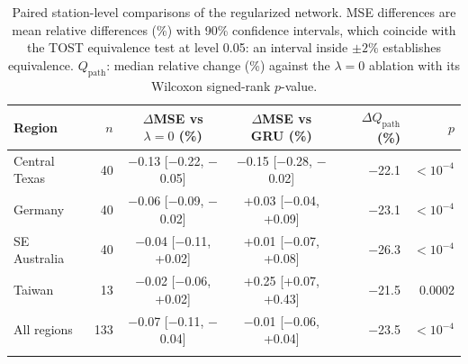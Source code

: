 \begin{table}[tbp]
\caption{Paired station-level comparisons of the regularized network. MSE differences are mean relative differences (\%)
with 90\% confidence intervals, which coincide with the TOST equivalence test at level 0.05: an interval
inside $\pm2\%$ establishes equivalence. $Q_{\mathrm{path}}$: median relative change (\%) against the
$\lambda=0$ ablation with its Wilcoxon signed-rank $p$-value.}
\label{tab:forecastpaired}
\footnotesize\setlength{\tabcolsep}{4pt}
\begin{tabular*}{\textwidth}{@{\extracolsep\fill}lrccrr}
\toprule
Region & $n$ & $\Delta$MSE vs $\lambda=0$ (\%) & $\Delta$MSE vs GRU (\%) & $\Delta Q_{\mathrm{path}}$ (\%) & $p$\\
\midrule
Central Texas & 40 & $-$0.13 [$-$0.22, $-$0.05] & $-$0.15 [$-$0.28, $-$0.02] & $-$22.1 & $<10^{-4}$ \\
Germany & 40 & $-$0.06 [$-$0.09, $-$0.02] & +0.03 [$-$0.04, +0.09] & $-$23.1 & $<10^{-4}$ \\
SE Australia & 40 & $-$0.04 [$-$0.11, +0.02] & +0.01 [$-$0.07, +0.08] & $-$26.3 & $<10^{-4}$ \\
Taiwan & 13 & $-$0.02 [$-$0.06, +0.02] & +0.25 [+0.07, +0.43] & $-$21.5 & 0.0002 \\
All regions & 133 & $-$0.07 [$-$0.11, $-$0.04] & $-$0.01 [$-$0.06, +0.04] & $-$23.5 & $<10^{-4}$ \\
\botrule
\end{tabular*}
\end{table}
